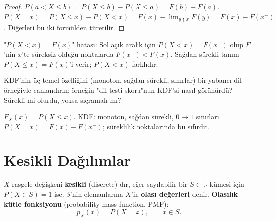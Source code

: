 \begin{proof}
$P(a < X \leq b) = P(X \leq b) - P(X \leq a) = F(b) - F(a)$.
$P(X = x) = P(X \leq x) - P(X < x) = F(x) - \lim_{y \uparrow x} F(y) = F(x) - F(x^-)$.
Diğerleri bu iki formülden türetilir.
\end{proof}

\begin{hataanalizi}
"$P(X < x) = F(x)$" hatası: Sol açık aralık için $P(X < x) = F(x^-)$
olup $F$'nin $x$'te süreksiz olduğu noktalarda $F(x^-) < F(x)$.
Sağdan sürekli tanım $P(X \leq x) = F(x)$'i verir; $P(X < x)$ farklıdır.
\end{hataanalizi}

\begin{kendinleifade}
KDF'nin üç temel özelliğini (monoton, sağdan sürekli, sınırlar)
bir yabancı dil örneğiyle canlandırın: örneğin "dil testi skoru"nun
KDF'si nasıl görünürdü? Sürekli mi olurdu, yoksa sıçramalı mı?
\end{kendinleifade}

\begin{mikroozet}
$F_X(x) = P(X \leq x)$. KDF: monoton, sağdan sürekli, $0 \to 1$ sınırları.
$P(X = x) = F(x) - F(x^-)$; süreklilik noktalarında bu sıfırdır.
\end{mikroozet}

\section{Kesikli Dağılımlar}
\label{sec:kesikli}

\begin{tanim}
\label{def:kesikli}
$X$ rasgele değişkeni \textbf{kesikli} (discrete) dır, eğer
sayılabilir bir $S \subset \mathbb{R}$ kümesi için $P(X \in S) = 1$ ise.
$S$'nin elemanlarına $X$'in \textbf{olası değerleri} denir.
\textbf{Olasılık kütle fonksiyonu} (probability mass function, PMF):
\[
  p_X(x) = P(X = x), \qquad x \in S.
\]
\end{tanim}

